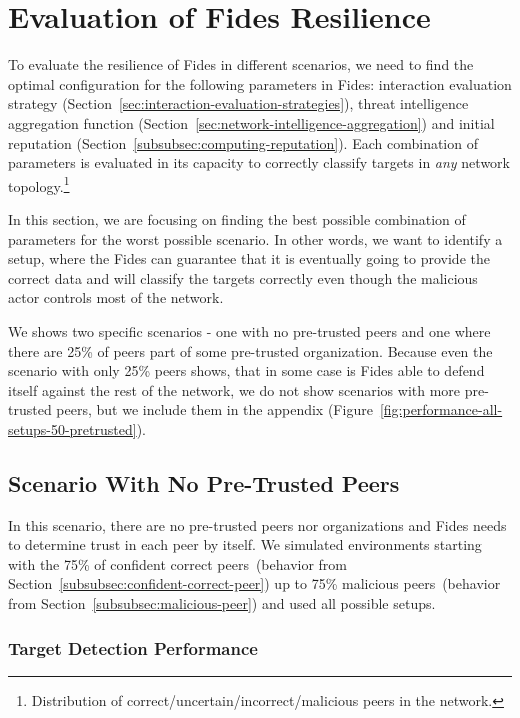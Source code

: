 \section{Evaluation of Fides Resilience}
\label{sec:fides-resilience}

To evaluate the resilience of Fides in different scenarios, we need to find the optimal configuration for the following parameters in Fides: interaction evaluation strategy (Section~\ref{sec:interaction-evaluation-strategies}), threat intelligence aggregation function (Section~\ref{sec:network-intelligence-aggregation}) and initial reputation (Section~\ref{subsubsec:computing-reputation}). Each combination of parameters is evaluated in its capacity to correctly classify targets in \textit{any} network topology.\footnote{Distribution of correct/uncertain/incorrect/malicious peers in the network.}

In this section, we are focusing on finding the best possible combination of parameters for the worst possible scenario. In other words, we want to identify a setup, where the Fides can guarantee that it is eventually going to provide the correct data and will classify the targets correctly even though the malicious actor controls most of the network.

We shows two specific scenarios - one with no pre-trusted peers and one where there are 25\% of peers part of some pre-trusted organization. Because even the scenario with only 25\% peers shows, that in some case is Fides able to defend itself against the rest of the network, we do not show scenarios with more pre-trusted peers, but we include them in the appendix (Figure~\ref{fig:performance-all-setups-50-pretrusted}).

\subsection{Scenario With No Pre-Trusted Peers}
\label{subsec:scenario-with-0-pretrusted-peers}

In this scenario, there are no pre-trusted peers nor organizations and Fides needs to determine trust in each peer by itself.
We simulated environments starting with the 75\% of confident correct peers~(behavior from Section~\ref{subsubsec:confident-correct-peer}) up to 75\% malicious peers~(behavior from Section~\ref{subsubsec:malicious-peer}) and used all possible setups.

\cleartoleftpage %
\subsubsection{Target Detection Performance}

